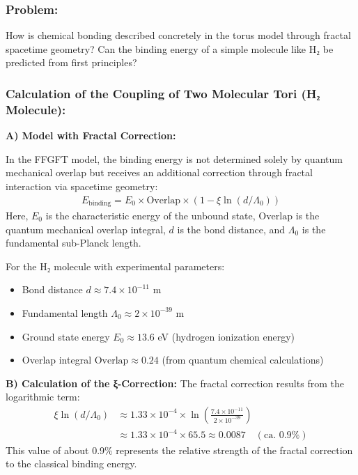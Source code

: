 	\subsubsection*{Problem:}
	How is chemical bonding described concretely in the torus model through fractal spacetime geometry? Can the binding energy of a simple molecule like H₂ be predicted from first principles?
	
	\subsubsection*{Calculation of the Coupling of Two Molecular Tori (H₂ Molecule):}
	
	\textbf{A) Model with Fractal Correction:}
	
	In the FFGFT model, the binding energy is not determined solely by quantum mechanical overlap but receives an additional correction through fractal interaction via spacetime geometry:
	\begin{align*}
		E_{\text{binding}} = E_0 \times \text{Overlap} \times \left(1 - \xi \ln(d/\Lambda_0)\right)
	\end{align*}
	Here, $E_0$ is the characteristic energy of the unbound state, $\text{Overlap}$ is the quantum mechanical overlap integral, $d$ is the bond distance, and $\Lambda_0$ is the fundamental sub-Planck length.
	
	For the H₂ molecule with experimental parameters:
	\begin{itemize}
		\item Bond distance $d \approx 7.4 \times 10^{-11}$ m
		\item Fundamental length $\Lambda_0 \approx 2 \times 10^{-39}$ m
		\item Ground state energy $E_0 \approx 13.6$ eV (hydrogen ionization energy)
		\item Overlap integral $\text{Overlap} \approx 0.24$ (from quantum chemical calculations)
	\end{itemize}
	
	\textbf{B) Calculation of the ξ-Correction:}
	The fractal correction results from the logarithmic term:
	\begin{align*}
		\xi \ln(d/\Lambda_0) &\approx 1.33 \times 10^{-4} \times \ln\left(\frac{7.4 \times 10^{-11}}{2 \times 10^{-39}}\right) \\
		&\approx 1.33 \times 10^{-4} \times 65.5 \approx 0.0087 \quad (\text{ca. } 0.9\%)
	\end{align*}
	This value of about 0.9\% represents the relative strength of the fractal correction to the classical binding energy.
	
